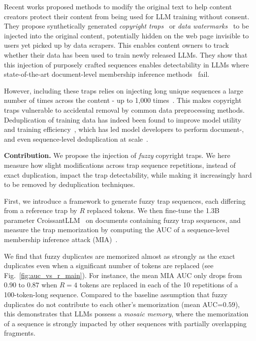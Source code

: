 Recent works proposed methods to modify the original text to help content creators protect their content from being used for LLM training without consent. They propose synthetically generated \emph{copyright traps}~\cite{meeus2024copyright} or \emph{data watermarks}~\cite{wei2024proving, wang2023wasa} to be injected into the original content, potentially hidden on the web page invisible to users yet picked up by data scrapers. This enables content owners to track whether their data has been used to train newly released LLMs. They show that this injection of purposely crafted sequences enables detectability in LLMs where state-of-the-art document-level membership inference methods~\cite{meeus2023did,shi2023detecting} fail. 

However, including these traps relies on injecting long unique sequences a large number of times across the content - up to 1,000 times~\cite{meeus2024copyright}. This makes copyright traps vulnerable to accidental removal by common data preprocessing methods. Deduplication of training data has indeed been found to improve model utility and training efficiency~\cite{lee2022deduplicating,hernandez2022scaling,allamanis2019adverse,tirumala2024d4,hoffmann2022training,xue2024repeat}, which has led model developers to perform document-, and even sequence-level deduplication at scale~\cite{kudugunta2024madlad,penedo2023refinedweb}. 

\textbf{Contribution.} We propose the injection of \emph{fuzzy} copyright traps. We here measure how slight modifications across trap sequence repetitions, instead of exact duplication, impact the trap detectability, while making it increasingly hard to be removed by deduplication techniques. 

First, we introduce a framework to generate fuzzy trap sequences, each differing from a reference trap by $R$ replaced tokens. We then fine-tune the 1.3B parameter CroissantLLM~\cite{faysse2024croissantllm} on documents containing fuzzy trap sequences, and measure the trap memorization by computing the AUC of a sequence-level membership inference attack (MIA)~\cite{carlini2021extracting, kandpal2022deduplicating}. 

We find that fuzzy duplicates are memorized almost as strongly as the exact duplicates even when a significant number of tokens are replaced (see Fig.~\ref{fig:auc_vs_r_main}). For instance, the mean MIA AUC only drops from $0.90$ to $0.87$ when $R=4$ tokens are replaced in each of the 10 repetitions of a 100-token-long sequence. Compared to the baseline assumption that fuzzy duplicates do not contribute to each other's memorization (mean AUC=$0.59$), this demonstrates that LLMs possess a \emph{mosaic memory}, where the memorization of a sequence is strongly impacted by other sequences with partially overlapping fragments.

